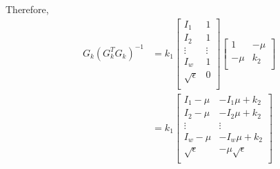 \documentclass[journal]{IEEEtran}
\begin{document}
Therefore, 
\begin{equation}
    \begin{aligned}
        G_k (G_k^T G_k)^{-1} &= k_1 \begin{bmatrix}
            I_1 & 1 \\ I_2 & 1 \\ \vdots & \vdots \\ 
            I_w & 1 \\ \sqrt{\epsilon} & 0 \\
        \end{bmatrix} 
        \begin{bmatrix}
            1 & -\mu \\
            -\mu & k_2 \\
        \end{bmatrix} \\
        &= k_1 \begin{bmatrix}
            I_1 - \mu & -I_1 \mu + k_2 \\
            I_2 - \mu & -I_2 \mu + k_2 \\
            \vdots & \vdots \\
            I_w - \mu & -I_w \mu + k_2 \\
            \sqrt{\epsilon} & -\mu \sqrt{\epsilon} \\
        \end{bmatrix} \\
    \end{aligned}
    \label{equ24}
\end{equation}
\end{document}
